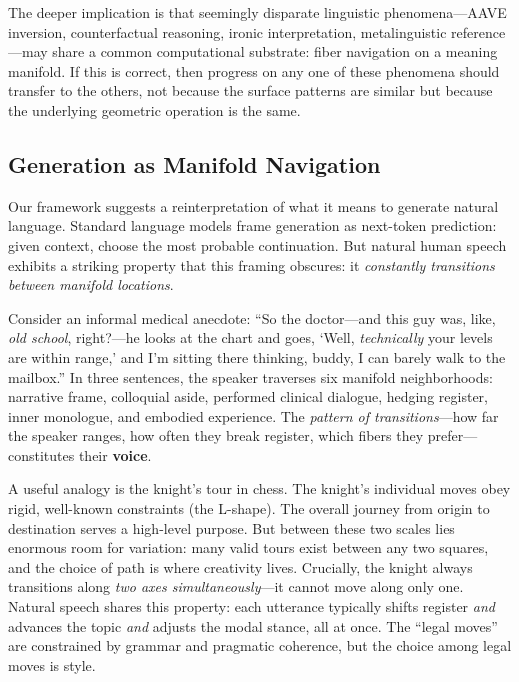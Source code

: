 \documentclass[11pt]{article}
\begin{document}
The deeper implication is that seemingly disparate linguistic phenomena---AAVE 
inversion, counterfactual reasoning, ironic interpretation, 
metalinguistic reference---may share a common computational substrate: 
fiber navigation on a meaning manifold. If this is correct, then progress 
on any one of these phenomena should transfer to the others, not because 
the surface patterns are similar but because the underlying geometric 
operation is the same.

\subsection{Generation as Manifold Navigation}

Our framework suggests a reinterpretation of what it means to generate 
natural language. Standard language models frame generation as next-token 
prediction: given context, choose the most probable continuation. But 
natural human speech exhibits a striking property that this framing 
obscures: it \emph{constantly transitions between manifold locations}.

Consider an informal medical anecdote: ``So the doctor---and this guy was, 
like, \emph{old school}, right?---he looks at the chart and goes, `Well, 
\emph{technically} your levels are within range,' and I'm sitting there 
thinking, buddy, I can barely walk to the mailbox.'' In three sentences, 
the speaker traverses six manifold neighborhoods: narrative frame, 
colloquial aside, performed clinical dialogue, hedging register, inner 
monologue, and embodied experience. The \emph{pattern of transitions}---how 
far the speaker ranges, how often they break register, which fibers they 
prefer---constitutes their \textbf{voice}.

A useful analogy is the knight's tour in chess. The knight's individual 
moves obey rigid, well-known constraints (the L-shape). The overall 
journey from origin to destination serves a high-level purpose. But 
between these two scales lies enormous room for variation: many valid 
tours exist between any two squares, and the choice of path is where 
creativity lives. Crucially, the knight always transitions along 
\emph{two axes simultaneously}---it cannot move along only one. Natural 
speech shares this property: each utterance typically shifts register 
\emph{and} advances the topic \emph{and} adjusts the modal stance, all 
at once. The ``legal moves'' are constrained by grammar and pragmatic 
coherence, but the choice among legal moves is style.
\end{document}
